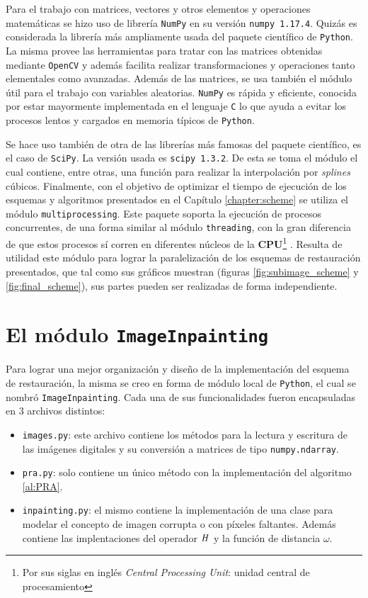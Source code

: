 Para el trabajo con matrices, vectores y otros elementos y operaciones matem\'aticas se hizo uso de librer\'ia \texttt{NumPy} en su versi\'on \texttt{numpy 1.17.4}. Quizás es considerada la librer\'ia m\'as ampliamente usada del paquete científico de \texttt{Python}. La misma provee las herramientas para tratar con las matrices obtenidas mediante \texttt{OpenCV} y adem\'as facilita realizar transformaciones y operaciones tanto elementales como avanzadas. Adem\'as de las matrices, se usa tambi\'en el m\'odulo  \'util para el trabajo con variables aleatorias. \texttt{NumPy} es r\'apida y eficiente, conocida por estar mayormente implementada en el lenguaje \texttt{C} lo que ayuda a evitar los procesos lentos y cargados en memoria t\'ipicos de \texttt{Python}.

Se hace uso tambi\'en de otra de las librer\'ias m\'as famosas del paquete científico, es el caso de \texttt{SciPy}. La versión usada es \texttt{scipy 1.3.2}. De esta se toma el m\'odulo  el cual contiene, entre otras, una funci\'on para realizar la interpolaci\'on por \textit{splines} c\'ubicos. Finalmente, con el objetivo de optimizar el tiempo de ejecuci\'on de los esquemas y algoritmos presentados en el Cap\'itulo \ref{chapter:scheme} se utiliza el m\'odulo \texttt{multiprocessing}. Este paquete soporta la ejecuci\'on de procesos concurrentes, de una forma similar al m\'odulo \texttt{threading}, con la gran diferencia de que estos procesos s\'i corren en diferentes n\'ucleos de la \textbf{CPU}\footnote{Por sus siglas en ingl\'es \textit{Central Processing Unit}: unidad central de procesamiento} \cite{enwiki:cpu}. Resulta de utilidad este m\'odulo para lograr la paralelizaci\'on de los esquemas de restauraci\'on presentados, que tal como sus gr\'aficos muestran (figuras \ref{fig:subimage_scheme} y \ref{fig:final_scheme}), sus partes pueden ser realizadas de forma independiente.

\section{El m\'odulo \texttt{ImageInpainting}}\label{sec:imageinpainting_module}

Para lograr una mejor organizaci\'on y diseño de la implementaci\'on del esquema de restauraci\'on, la misma se creo en forma de m\'odulo local de \texttt{Python}, el cual se nombr\'o \texttt{ImageInpainting}. Cada una de sus funcionalidades fueron encapsuladas en 3 archivos distintos:
\begin{itemize}
	\item \texttt{images.py}: este archivo contiene los m\'etodos para la lectura y escritura de las im\'agenes digitales y su conversi\'on a matrices de tipo \texttt{numpy.ndarray}.
	\item \texttt{pra.py}: solo contiene un \'unico m\'etodo con la implementaci\'on del algoritmo \ref{al:PRA}.
	\item \texttt{inpainting.py}: el mismo contiene la implementaci\'on de una clase para modelar el concepto de imagen corrupta o con p\'ixeles faltantes. Adem\'as contiene las implentaciones del operador $\mathit{H}$ y la funci\'on de distancia $\omega$. 
\end{itemize}

